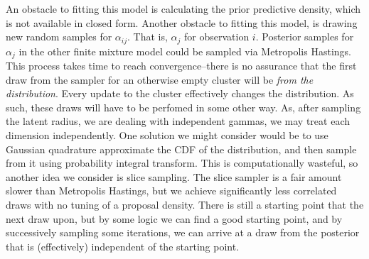 An obstacle to fitting this model is calculating the prior predictive density,
  which is not available in closed form.  Another obstacle to fitting this
  model, is drawing new random samples for $\alpha_{ij}$.  That is, $\alpha_j$
  for observation $i$.  Posterior samples for $\alpha_j$ in the other finite
  mixture model could be sampled via Metropolis Hastings.  This process takes
  time to reach convergence--there is no assurance that the first draw from
  the sampler for an otherwise empty cluster will be \emph{from the distribution}.
  Every update to the cluster effectively changes the distribution.  As such,
  these draws will have to be perfomed in some other way.  As, after sampling the
  latent radius, we are dealing with independent gammas, we may treat each dimension
  independently.  One solution we might consider would be to use Gaussian quadrature
  approximate the CDF of the distribution, and then sample from it using probability
  integral transform.  This is computationally wasteful, so another idea we
  consider is slice sampling.  The slice sampler is a fair amount slower than
  Metropolis Hastings, but we achieve significantly less correlated draws with no
  tuning of a proposal density.  There is still a starting point that the next draw
  upon, but by some logic we can find a good starting point, and by successively
  sampling some iterations, we can arrive at a draw from the posterior that is
  (effectively) independent of the starting point.


